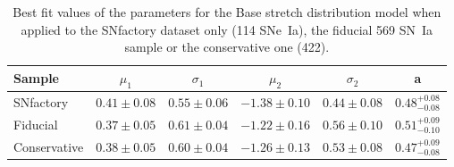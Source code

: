 \documentclass[]{aa} %
\newcommand{\agk}[1]{\textcolor{purple}{AK: #1}}
\begin{document}
\begin{table}
    \centering
    \caption{Best fit values of the parameters for the Base stretch distribution
    model when applied to the SNfactory dataset only (114 SNe~Ia), the fiducial
569 SN~Ia sample or the conservative one (422).}
    \label{tab:modelresults}
    \begin{tabular}{lccccc}
        \hline\hline
        Sample & $\mu_1$  & $\sigma_1$
               & $\mu_2$ & $\sigma_2$
               & a \\
        \hline
        SNfactory & $0.41 \pm 0.08$ & $0.55 \pm 0.06$
                  & $-1.38 \pm 0.10$ & $0.44 \pm 0.08$
                  & $0.48^{+0.08}_{-0.08}$ \\
        Fiducial & $0.37 \pm 0.05$  & $0.61 \pm 0.04$
                 & $-1.22 \pm 0.16$ & $0.56 \pm 0.10$
                 & $0.51^{+0.09}_{-0.10}$ \\
        Conservative & $0.38 \pm 0.05$  & $0.60 \pm 0.04$
                     & $-1.26 \pm 0.13$ & $0.53 \pm 0.08$
                     & $0.47^{+0.09}_{-0.08}$ \\
        \hline
    \end{tabular}
\end{table}
\end{document}
